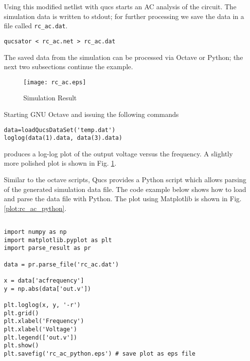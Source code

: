 Using this modified netlist with qucs starts an AC analysis of the circuit. The simulation data is written to stdout; for further processing we save the data in a file called \verb+rc_ac.dat+.

\begin{verbatim}
qucsator < rc_ac.net > rc_ac.dat
\end{verbatim}

The saved data from the simulation can be processed via Octave or Python; the next two subsections continue the example.

\begin{figure}[htb]
\begin{center}
  \texttt{[image: rc\_ac.eps]}
  \caption{Simulation Result}
  \label{plot:rc_ac_octave}
\end{center}
\end{figure}





Starting GNU Octave and issuing the following commands

\begin{verbatim}
data=loadQucsDataSet('temp.dat')
loglog(data(1).data, data(3).data)
\end{verbatim}

produces a log-log plot of the output voltage versus the frequency. A slightly more polished plot is shown in Fig. \ref{plot:rc_ac_octave}.



Similar to the octave scripts, Qucs provides a Python script which allows parsing of the generated simulation data file. The code example below shows how to load and parse the data file with Python. The plot using Matplotlib is shown in Fig. \ref{plot:rc_ac_python}.


\begin{verbatim}

import numpy as np
import matplotlib.pyplot as plt
import parse_result as pr

data = pr.parse_file('rc_ac.dat')

x = data['acfrequency']
y = np.abs(data['out.v'])

plt.loglog(x, y, '-r')
plt.grid()
plt.xlabel('Frequency')
plt.xlabel('Voltage')
plt.legend(['out.v'])
plt.show()
plt.savefig('rc_ac_python.eps') # save plot as eps file

\end{verbatim}


